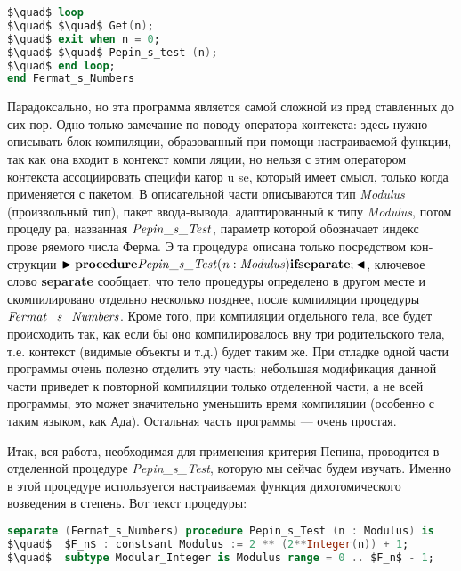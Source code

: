  \newpage

\begin{lstlisting}[mathescape=true, language=Ada, basicstyle=\small]
$\quad$ loop
$\quad$ $\quad$ Get(n);
$\quad$ exit when n = 0;
$\quad$ $\quad$ Pepin_s_test (n);
$\quad$ end loop;
end Fermat_s_Numbers
\end{lstlisting}
 
 \par Парадоксально, но эта программа является самой сложной из пред­
ставленных до сих пор. Одно только замечание по поводу оператора
контекста: здесь нужно описывать блок компиляции, образованный при
помощи настраиваемой функции, так как она входит в контекст компи­
ляции, но нельзя с этим оператором контекста ассоциировать специфи­
катор u se, который имеет смысл, только когда применяется с пакетом.
В описательной части описываются тип {\it Modulus} (произвольный тип),
пакет ввода-вывода, адаптированный к типу {\it Modulus}, потом процеду­
ра, названная ${\it Pepin\_ s\_ Test}$, параметр которой обозначает индекс прове­
ряемого числа Ферма. Э та процедура описана только посредством кон­
струкции $\blacktriangleright {\bf procedure} {\it Pepin\_ s\_ Test (n:Modulus)} {\bf if separate}; \blacktriangleleft$, ключевое слово {\bf separate} сообщает, что тело процедуры определено в другом
месте и скомпилировано отдельно несколько позднее, после компиляции
процедуры ${\it Fermat\_ s\_ Numbers}$. Кроме того, при компиляции отдельного
тела, все будет происходить так, как если бы оно компилировалось вну­
три родительского тела, т.е. контекст (видимые объекты и т.д.) будет
таким же. При отладке одной части программы очень полезно отделить
эту часть; небольшая модификация данной части приведет к повторной
компиляции только отделенной части, а не всей программы, это может
значительно уменьшить время компиляции (особенно с таким языком,
как Ада). Остальная часть программы — очень простая.
\par Итак, вся работа, необходимая для применения критерия Пепина,
проводится в отделенной процедуре {\it Pepin\_s\_Test}, которую мы сейчас
будем изучать. Именно в этой процедуре используется настраиваемая
функция дихотомического возведения в степень. Вот текст процедуры:

\begin{lstlisting}[mathescape=true, language=Ada, basicstyle=\small]
separate (Fermat_s_Numbers) procedure Pepin_s_Test (n : Modulus) is
$\quad$  $F_n$ : constsant Modulus := 2 ** (2**Integer(n)) + 1;
$\quad$  subtype Modular_Integer is Modulus range = 0 .. $F_n$ - 1;
\end{lstlisting}


